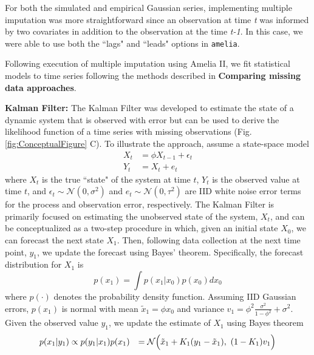 \documentclass{article}
\begin{document}
For both the simulated and empirical Gaussian series, implementing multiple imputation was more straightforward since an observation at time \textit{t} was informed by two covariates in addition to the observation at the time \textit{t-1}. In this case, we were able to use both the ``lags" and ``leads" options in \texttt{amelia}. 

Following execution of multiple imputation using Amelia II, we fit statistical models to time series following the methods described in \textbf{Comparing missing data approaches}. 

\noindent\textbf{Kalman Filter:} The Kalman Filter was developed to estimate the state of a dynamic system that is observed with error but can be used to derive the likelihood function of a time series with missing observations (Fig. \ref{fig:ConceptualFigure} C). To illustrate the approach, assume a state-space model
\begin{equation*}
    \begin{aligned}
        X_t &= \phi X_{t-1} + \epsilon_t \\Y_t &= X_t + e_t
    \end{aligned}
\end{equation*}
where $X_t$ is the true ``state" of the system at time $t$, $Y_t$ is the observed value at time $t$, and $\epsilon_t \sim \mathcal{N}(0, \sigma^2)$ and $e_t \sim \mathcal{N}(0, \tau^2)$ are IID white noise error terms for the process and observation error, respectively. The Kalman Filter is primarily focused on estimating the unobserved state of the system, $X_t$, and can be conceptualized as a two-step procedure in which, given an initial state $X_0$, we can forecast the next state $X_1$. Then, following data collection at the next time point, $y_1$, we update the forecast using Bayes' theorem. Specifically, the forecast distribution for $X_1$ is
\begin{equation*}
    p(x_1) = \int p(x_1 | x_0)p(x_0)dx_0
\end{equation*}
where $p(\cdot)$ denotes the probability density function. Assuming IID Gaussian errors, $p(x_1)$ is normal with mean ${\tilde x}_1 = \phi x_0$ and variance $v_1 = \phi^2 \frac{\sigma^2}{1 - \phi^2} + \sigma^2$. Given the observed value $y_1$, we update the estimate of $X_1$ using Bayes theorem
\begin{equation*}
    \begin{aligned}
        p(x_1 | y_1) &\propto p(y_1 | x_1) p(x_1)
        &= \mathcal{N}\Bigl(\tilde x_1 + K_1(y_1 - \tilde x_1),\ (1 - K_1)v_1 \Bigr)
    \end{aligned} 
\end{equation*}
\end{document}
